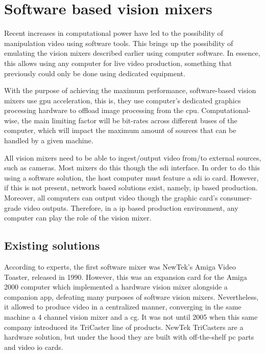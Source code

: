 \documentclass[../main.tex]{subfiles}
\begin{document}
\section{Software based vision mixers}
Recent increases in computational power have led to the possibility of manipulation video using software tools. This brings up the possibility of emulating the vision mixers described earlier using computer software. In essence, this allows using any computer for live video production, something that previously could only be done using dedicated equipment\cite{wikiSoftware_vision_mixer}.\newline

With the purpose of achieving the maximum performance, software-based vision mixers use \gls{gpu} acceleration, this is, they use computer's dedicated graphics processing hardware to offload image processing from the \gls{cpu}. Computational-wise, the main limiting factor will be bit-rates across different buses of the computer, which will impact the maximum amount of sources that can be handled by a given machine.\newline

All vision mixers need to be able to ingest/output video from/to external sources, such as cameras. Most mixers do this though the \gls{sdi} interface. In order to do this using a software solution, the host computer must feature a \gls{sdi} \gls{io} card. However, if this is not present, network based solutions exist, namely, \gls{ip} based production. Moreover, all computers can output video though the graphic card's consumer-grade video outputs. Therefore, in a \gls{ip} based production environment, any computer can play the role of the vision mixer.\newline



\subsection{Existing solutions}
According to experts, the first software mixer was NewTek's Amiga Video Toaster, released in 1990. However, this was an expansion card for the Amiga 2000 computer which implemented a hardware vision mixer alongside a companion app, defeating many purposes of software vision mixers. Nevertheless, it allowed to produce video in a centralized manner, converging in the same machine a 4 channel vision mixer and a \gls{cg}. It was not until 2005 when this same company introduced its TriCaster line of products\cite{neoteoAmigaVideoToaster}. NewTek TriCasters are a hardware solution, but under the hood they are built with off-the-shelf \gls{pc} parts and video \gls{io} cards.\newline
\end{document}
